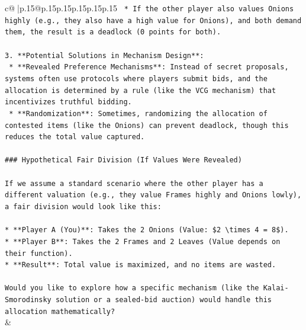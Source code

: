 \documentclass{article}
\begin{document}
{\begin{supertabular}{c@{$\;$}|p{.15\linewidth}@{}p{.15\linewidth}p{.15\linewidth}p{.15\linewidth}p{.15\linewidth}p{.15\linewidth}}
{{{\texttt{    *   If the other player also values Onions highly (e.g., they also have a high value for Onions), and both demand them, the result is a deadlock (0 points for both).} \\
\\ 
\texttt{3.  **Potential Solutions in Mechanism Design**:} \\
\texttt{    *   **Revealed Preference Mechanisms**: Instead of secret proposals, systems often use protocols where players submit bids, and the allocation is determined by a rule (like the VCG mechanism) that incentivizes truthful bidding.} \\
\texttt{    *   **Randomization**: Sometimes, randomizing the allocation of contested items (like the Onions) can prevent deadlock, though this reduces the total value captured.} \\
\\ 
\texttt{\#\#\# Hypothetical Fair Division (If Values Were Revealed)} \\
\\ 
\texttt{If we assume a standard scenario where the other player has a different valuation (e.g., they value Frames highly and Onions lowly), a fair division would look like this:} \\
\\ 
\texttt{*   **Player A (You)**: Takes the 2 Onions (Value: \$2 \textbackslash{}times 4 = 8\$).} \\
\texttt{*   **Player B**: Takes the 2 Frames and 2 Leaves (Value depends on their function).} \\
\texttt{*   **Result**: Total value is maximized, and no items are wasted.} \\
\\ 
\texttt{Would you like to explore how a specific mechanism (like the Kalai{-}Smorodinsky solution or a sealed{-}bid auction) would handle this allocation mathematically?} \\
            }
        }
    }
    & \\ \\


\end{supertabular}}
\end{document}
